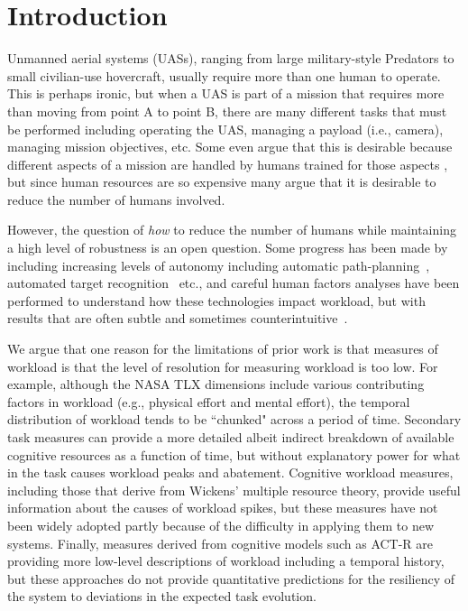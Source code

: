 \section{Introduction}

Unmanned aerial systems (UASs), ranging from large military-style Predators to small civilian-use hovercraft, usually require more than one human to operate.  This is perhaps ironic, but when a UAS is part of a mission that requires more than moving from point A to point B, there are many different tasks that must be performed including operating the UAS, managing a payload (i.e., camera), managing mission objectives, etc.  Some even argue that this is desirable because different aspects of a mission are handled by humans trained for those aspects \cite{Murphy}, but since human resources are so expensive many argue that it is desirable to reduce the number of humans involved.

However, the question of {\em how} to reduce the number of humans while maintaining a high level of robustness is an open question.  Some progress has been made by including increasing levels of autonomy including automatic path-planning~\cite{}, automated target recognition~\cite{} etc., and careful human factors analyses have been performed to understand how these technologies impact workload, but with results that are often subtle and sometimes counterintuitive~\cite{}.

We argue that one reason for the limitations of prior work is that measures of workload is that the level of resolution for measuring workload is too low.  For example, although the NASA TLX dimensions include various contributing factors in workload (e.g., physical effort and mental effort), the temporal distribution of workload tends to be ``chunked" across a period of time.  Secondary task measures can provide a more detailed albeit indirect breakdown of available cognitive resources as a function of time, but without explanatory power for what in the task causes workload peaks and abatement.  Cognitive workload measures, including those that derive from Wickens' multiple resource theory, provide useful information about the causes of workload spikes, but these measures have not been widely adopted partly because of the difficulty in applying them to new systems.  Finally, measures derived from cognitive models such as ACT-R are providing more low-level descriptions of workload including a temporal history, but these approaches do not provide quantitative predictions for the resiliency of the system to deviations in the expected task evolution.

